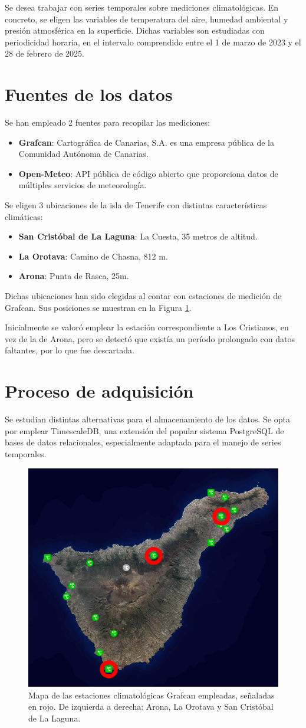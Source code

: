 
Se desea trabajar con series temporales sobre mediciones climatológicas. 
En concreto, se eligen las variables de temperatura del aire, humedad ambiental y presión atmosférica en la superficie.
Dichas variables son estudiadas con periodicidad horaria, en el intervalo comprendido entre el 1 de marzo de 2023 y el 28 de febrero de 2025.
\section{Fuentes de los datos}

Se han empleado 2 fuentes para recopilar las mediciones: 
\begin{itemize}
    \item \textbf{Grafcan}: Cartográfica de Canarias, S.A. es una empresa pública de la Comunidad Autónoma de Canarias.
    \item \textbf{Open-Meteo}: API pública de código abierto que proporciona datos de múltiples servicios de meteorología.
\end{itemize}

Se eligen 3 ubicaciones de la isla de Tenerife con distintas características climáticas:
\begin{itemize}
    \item \textbf{San Cristóbal de La Laguna}: La Cuesta, 35 metros de altitud.
    \item \textbf{La Orotava}: Camino de Chasna, 812 m.
    \item \textbf{Arona}: Punta de Rasca, 25m.
\end{itemize}
Dichas ubicaciones han sido elegidas al contar con estaciones de medición de Grafcan.
Sus posiciones se muestran en la Figura \ref{mapa_estaciones}.

Inicialmente se valoró emplear la estación correspondiente a Los Cristianos, en vez de la de Arona, pero se detectó que existía un período prolongado con datos faltantes, por lo que fue descartada.
\bigskip

\section{Proceso de adquisición}

Se estudian distintas alternativas para el almacenamiento de los datos.
Se opta por emplear TimescaleDB, una extensión del popular sistema PostgreSQL
de bases de datos relacionales, especialmente adaptada para el manejo de series temporales. 

\begin{figure}[htb]
   \centering
   \includegraphics[width=0.6\linewidth]{images/mapa_estaciones}
   \caption{Mapa de las estaciones climatológicas Grafcan empleadas, señaladas en rojo. De izquierda a derecha: Arona, La Orotava y San Cristóbal de La Laguna.}
   \label{mapa_estaciones}
\end{figure}